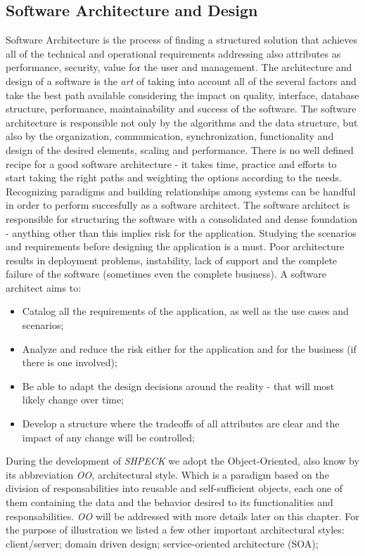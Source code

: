 \documentclass[ppgc,mestrado,english]{iiufrgs}
\begin{document}
\subsection{Software Architecture and Design}
Software Architecture is the process of finding a structured solution that achieves all of the technical and operational requirements addressing also attributes as performance, security, value for the user and management. The architecture and design of a software is the \emph{art} of taking into account all of the several factors and take the best path available considering the impact on quality, interface, database structure, performance, maintainability and success of the software.
The software architecture is responsible not only by the algorithms and the data structure, but also by the organization, communication, synchronization, functionality and design of the desired elements, scaling and performance. There is no well defined recipe for a good software architecture - it takes time, practice and efforts to start taking the right paths and weighting the options according to the needs. Recognizing paradigms and building relationships among systems can be handful in order to perform succesfully as a software architect.
The software architect is responsible for structuring the software with a consolidated and dense foundation - anything other than this implies risk for the application. Studying the scenarios and requirements before designing the application is a must. Poor architecture results in deployment problems, instability, lack of support and the complete failure of the software (sometimes even the complete business).
A software architect aims to: 
\begin{itemize}
\item Catalog all the requirements of the application, as well as the use cases and scenarios;
\item Analyze and reduce the risk either for the application and for the business (if there is one involved);
\item Be able to adapt the design decisions around the reality - that will most likely change over time;
\item Develop a structure where the tradeoffs of all attributes are clear and the impact of any change will be controlled;
\end{itemize}

During the development of \emph{SHPECK} we adopt the Object-Oriented, also know by its abbreviation \emph{OO}, architectural style. Which is a paradigm based on the division of responsabilities into reusable and self-sufficient objects, each one of them containing the data and the behavior desired to its functionalities and responsabilities. \emph{OO} will be addressed with more details later on this chapter. For the purpose of illustration we listed a few other important architectural styles: client/server; domain driven design; service-oriented architecture (SOA); 
\end{document}
